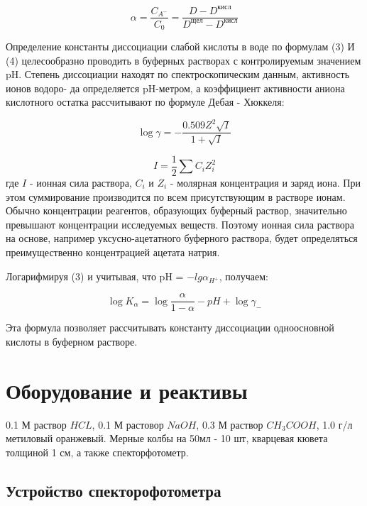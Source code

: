 \documentclass[a4paper,12pt]{article}
\begin{document}
\begin{equation}
    \alpha = \frac{C_{A^-}}{C_0} = \frac{D - D^{\text{кисл}}}{D^{\text{щел}} - D^{\text{кисл}}}
\end{equation}

Определение константы диссоциации слабой кислоты в воде по формулам (3) И (4)
целесообразно проводить в буферных растворах с контролируемым значением pH.
Степень диссоциации находят по спектроскопическим данным, активность ионов водоро-
да определяется pH-метром, а коэффициент активности аниона кислотного остатка
рассчитывают по формуле Дебая - Хюккеля:

\begin{equation}
    \log\gamma = -\frac{0.509Z^2\sqrt{I}}{1 + \sqrt{I}}
\end{equation}

\begin{equation}
    I = \frac{1}{2}\sum C_iZ_i^2
\end{equation}
где $I$ - ионная сила раствора, $C_i$ и $Z_i$ - молярная концентрация и заряд иона. При этом
суммирование производится по всем присутствующим в растворе ионам. Обычно
концентрации реагентов, образующих буферный раствор, значительно превышают
концентрации исследуемых веществ. Поэтому ионная сила раствора на основе, например
уксусно-ацетатного буферного раствора, будет определяться преимущественно
концентрацией ацетата натрия.

Логарифмируя (3) и учитывая, что pH = $-lg\alpha_{H^+}$, получаем:

\begin{equation}
    \log K_\alpha = \log\frac{\alpha}{1 - \alpha} - pH + \log\gamma_-
\end{equation}

Эта формула позволяет рассчитывать константу диссоциации одноосновной кислоты в
буферном растворе.

\section*{Оборудование и реактивы}

0.1 М раствор $HCL$, 0.1 М растовор $NaOH$, 0.3 М раствор $CH_3COOH$, 1.0 г/л метиловый оранжевый. Мерные колбы на 50мл - 10 шт, кварцевая кювета толщиной 1 см, а также спекторфотометр.

\subsection*{Устройство спекторофотометра}
\end{document}
